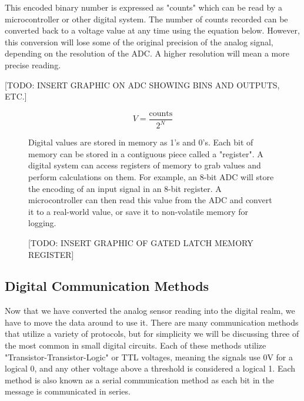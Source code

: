 This encoded binary number is expressed as "counts" which can be read by a microcontroller or other digital system.
The number of counts recorded can be converted back to a voltage value at any time using the equation below.
However, this conversion will lose some of the original precision of the analog signal, depending on the resolution of the ADC.
A higher resolution will mean a more precise reading.

[TODO: INSERT GRAPHIC ON ADC SHOWING BINS AND OUTPUTS, ETC.]

\begin{equation*}
    V = \frac{\text{counts}}{2^N}
\end{equation*}

\begin{figure}
    \begin{fitbox}[frametitle=Aside: Registers]
        Digital values are stored in memory as 1's and 0's.
        Each bit of memory can be stored in a contiguous piece called a "register".
        A digital system can access registers of memory to grab values and perform calculations on them.
        For example, an 8-bit ADC will store the encoding of an input signal in an 8-bit register.
        A microcontroller can then read this value from the ADC and convert it to a real-world value, or save it to non-volatile memory for logging.

        [TODO: INSERT GRAPHIC OF GATED LATCH MEMORY REGISTER]
    \end{fitbox}
\end{figure}

\subsection{Digital Communication Methods}
Now that we have converted the analog sensor reading into the digital realm, we have to move the data around to use it.
There are many communication methods that utilize a variety of protocols, but for simplicity we will be discussing three of the most common in small digital circuits.
Each of these methods utilize "Transistor-Transistor-Logic" or TTL voltages, meaning the signals use 0V for a logical 0, and any other voltage above a threshold is considered a logical 1.
Each method is also known as a serial communication method as each bit in the message is communicated in series.

